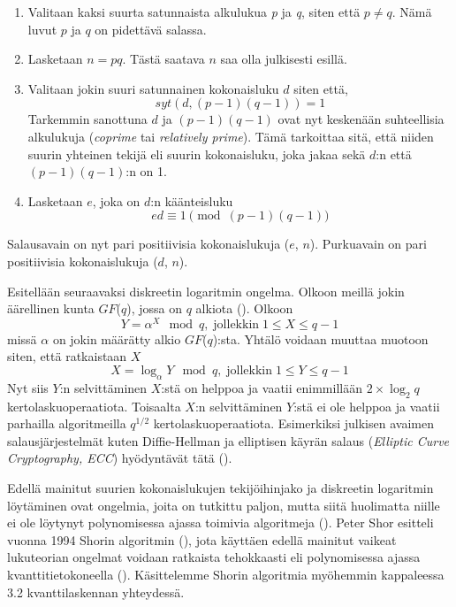   \begin{enumerate}
  
      \item Valitaan kaksi suurta satunnaista alkulukua \emph{p} ja \emph{q}, siten että $p \neq q$. Nämä luvut $p$ ja $q$ on pidettävä salassa.
      
      \item Lasketaan $n = pq$. Tästä saatava $n$ saa olla julkisesti esillä.
      
      \item Valitaan jokin suuri satunnainen kokonaisluku $d$ siten että,
      \[syt(d, (p-1)(q-1)) = 1\]
      Tarkemmin sanottuna $d$ ja $(p-1)(q-1)$ ovat nyt keskenään suhteellisia alkulukuja (\emph{coprime} tai \emph{relatively prime}). Tämä tarkoittaa sitä, että niiden suurin yhteinen tekijä eli suurin kokonaisluku, joka jakaa sekä $d$:n että $(p-1)(q-1)$:n on 1.
      
      \item Lasketaan $e$, joka on $d$:n käänteisluku
      \[e d \equiv 1 \pmod{(p-1) (q-1)}\]
  \end{enumerate}
  Salausavain on nyt pari positiivisia kokonaislukuja ($e$, $n$). Purkuavain on pari positiivisia kokonaislukuja ($d$, $n$).
  
 Esitellään seuraavaksi diskreetin logaritmin ongelma. Olkoon meillä jokin äärellinen kunta $GF$($q$), jossa on $q$ alkiota (\cite{1055638}). Olkoon
 \begin{equation}
     \label{eq10}
     Y = \alpha^{X} \mod q, \; \text{jollekkin} \; 1 \leq X \leq q-1
 \end{equation}
 missä $\alpha$ on jokin määrätty alkio $GF$($q$):sta. Yhtälö voidaan muuttaa muotoon siten, että ratkaistaan $X$ 
 \begin{equation}
     \label{eq11}
     X = \log_{\alpha} Y \mod q, \; \text{jollekkin} \; 1 \leq Y \leq q-1
 \end{equation}
 Nyt siis $Y$:n selvittäminen $X$:stä on helppoa ja vaatii enimmillään $2 \times \log_{2}q$ kertolaskuoperaatiota. Toisaalta $X$:n selvittäminen $Y$:stä ei ole helppoa ja vaatii parhailla algoritmeilla $q^{1/2}$ kertolaskuoperaatiota. Esimerkiksi julkisen avaimen salausjärjestelmät kuten Diffie-Hellman ja elliptisen käyrän salaus (\emph{Elliptic Curve Cryptography, ECC}) hyödyntävät tätä (\cite{mavroeidis2018impact}).
 
 Edellä mainitut suurien kokonaislukujen tekijöihinjako ja diskreetin logaritmin löytäminen ovat ongelmia, joita on tutkittu paljon, mutta siitä huolimatta niille ei ole löytynyt polynomisessa ajassa toimivia algoritmeja (\cite{doi:10.1137/S0036144598347011}). Peter Shor esitteli vuonna 1994 Shorin algoritmin (\cite{mavroeidis2018impact}), jota käyttäen edellä mainitut vaikeat lukuteorian ongelmat voidaan ratkaista tehokkaasti eli polynomisessa ajassa kvanttitietokoneella (\cite{doi:10.1137/S0036144598347011}). Käsittelemme Shorin algoritmia myöhemmin kappaleessa 3.2 kvanttilaskennan yhteydessä.
 

